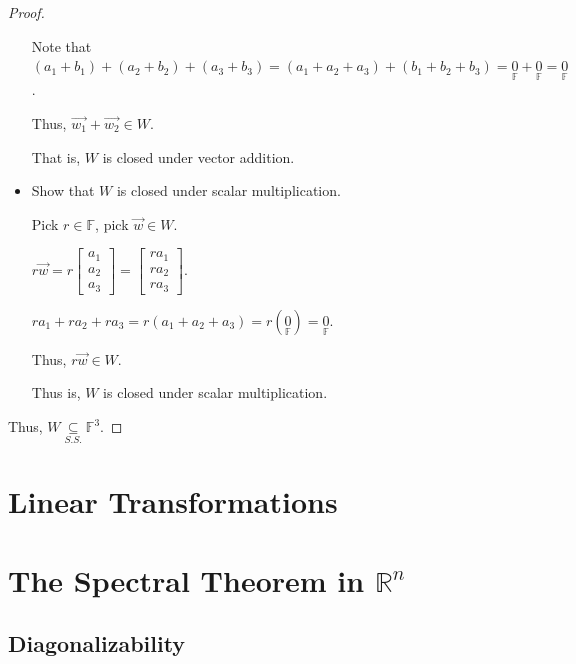 \documentclass[11pt,fleqn]{book} %
\begin{document}
\begin{example}
\begin{proof}
\begin{itemize}
            Note that $(a_1+b_1) + (a_2+b_2) + (a_3+b_3) = (a_1+a_2+a_3) + (b_1+b_2+b_3) = \underset{\mathbb{F}}{0}+\underset{\mathbb{F}}{0}=\underset{\mathbb{F}}{0}$. 
            
            Thus, $\overrightarrow{w_1} + \overrightarrow{w_2} \in W$. 
            
            That is, $W$ is closed under vector addition.

            \item Show that $W$ is closed under scalar multiplication. 
            
            Pick $r \in \mathbb{F}$, pick $\overrightarrow{w} \in W$. 
            
            $r\overrightarrow{w} = r\begin{bmatrix}a_1\\a_2\\a_3\end{bmatrix} = \begin{bmatrix}ra_1\\ra_2\\ra_3\end{bmatrix}$. 
            
            $ra_1+ra_2+ra_3 = r(a_1+a_2+a_3) = r(\underset{\mathbb{F}}{0}) = \underset{\mathbb{F}}{0}$. 
            
            Thus, $r\overrightarrow{w} \in W$. 
            
            Thus is, $W$ is closed under scalar multiplication. 
        \end{itemize}
        
        Thus, $W \underset{S.S.}{\subseteq} \mathbb{F}^3$. 
    \end{proof}
\end{example}

\chapter{Linear Transformations}

\chapter{The Spectral Theorem in $\mathbb{R}^n$}

\section{Diagonalizability}
\end{document}
